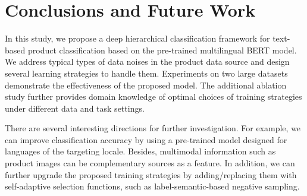 \documentclass[11pt,dvipsnames]{article}
\begin{document}
\begin{table}[h]
    \centering
    \caption{Influence of soft label in department/leaf classification. Improvement (+) or Downgrade (-). }
    \label{tab:labelsmooth}
\end{table}


\section{Conclusions and Future Work}
In this study, we propose a deep hierarchical classification framework for text-based product classification based on the pre-trained multilingual BERT model. We address typical types of data noises in the product data source and design several learning strategies to handle them. Experiments on two large datasets demonstrate the effectiveness of the proposed model. The additional ablation study further provides domain knowledge of optimal choices of training strategies under different data and task settings. 

There are several interesting directions for further investigation. For example, we can improve classification accuracy by using a pre-trained model designed for languages of the targeting locale. Besides, multimodal information such as product images can be complementary sources as a feature. In addition, we can further upgrade the proposed training strategies by adding/replacing them with self-adaptive selection functions, such as label-semantic-based negative sampling.    









  

%
%
\end{document}
